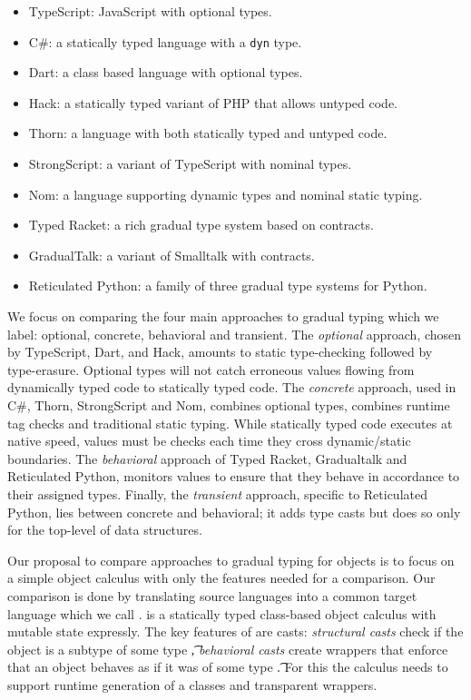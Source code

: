 \documentclass[a4paper,USenglish]{tex/lipics-v2016}
\begin{document}
\begin{itemize}
 \item TypeScript: JavaScript with optional types.
 \item C\#: a statically typed language with a {\tt dyn} type.
 \item Dart: a class based language with optional types.
 \item Hack: a statically typed variant of PHP that allows untyped code.
 \item Thorn: a language with both statically typed and untyped code.
 \item StrongScript: a variant of TypeScript with nominal types.
 \item Nom: a language supporting dynamic types and nominal static typing.
 \item Typed Racket: a rich gradual type system based on contracts.
 \item GradualTalk: a variant of Smalltalk with contracts.
\item Reticulated Python: a family of three gradual type systems for Python.
\end{itemize}

\noindent We focus on comparing the four main approaches to gradual typing
which we label: optional, concrete, behavioral and transient. The
\emph{optional} approach, chosen by TypeScript, Dart, and Hack, amounts to
static type-checking followed by type-erasure. Optional types will not catch
erroneous values flowing from dynamically typed code to statically typed
code.  The \emph{concrete} approach, used in C\#, Thorn, StrongScript and
Nom, combines optional types, combines runtime tag checks and traditional
static typing. While statically typed code executes at native speed, values
must be checks each time they cross dynamic/static boundaries. The
\emph{behavioral} approach of Typed Racket, Gradualtalk and Reticulated
Python, monitors values to ensure that they behave in accordance to their
assigned types.  Finally, the \emph{transient} approach, specific to
Reticulated Python, lies between concrete and behavioral; it adds type casts
but does so only for the top-level of data structures.

Our proposal to compare approaches to gradual typing for objects is to focus
on a simple object calculus with only the features needed for a comparison.
Our comparison is done by translating source languages into a common target
language which we call \kafka.  \kafka is a statically typed class-based
object calculus with mutable state expressly. The key features of \kafka are
casts: \emph{structural casts} check if the object is a subtype of some type
\t, \emph{behavioral casts} create wrappers that enforce that an object
behaves as if it was of some type \t. For this the calculus needs to support
runtime generation of a classes and transparent wrappers.
\end{document}
